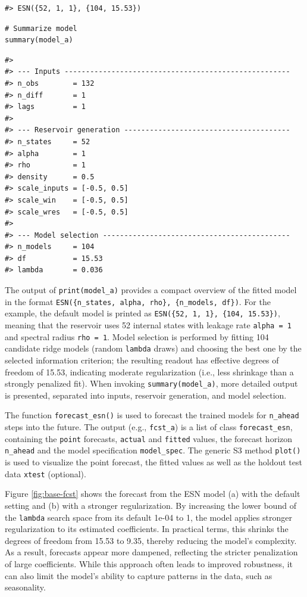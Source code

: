 \begin{verbatim}
#> ESN({52, 1, 1}, {104, 15.53})
\end{verbatim}

\begin{verbatim}
# Summarize model
summary(model_a)
\end{verbatim}

\begin{verbatim}
#> 
#> --- Inputs -----------------------------------------------------
#> n_obs        = 132
#> n_diff       = 1
#> lags         = 1
#> 
#> --- Reservoir generation ---------------------------------------
#> n_states     = 52
#> alpha        = 1
#> rho          = 1
#> density      = 0.5
#> scale_inputs = [-0.5, 0.5]
#> scale_win    = [-0.5, 0.5]
#> scale_wres   = [-0.5, 0.5]
#> 
#> --- Model selection --------------------------------------------
#> n_models     = 104
#> df           = 15.53
#> lambda       = 0.036
\end{verbatim}

The output of \texttt{print(model\_a)} provides a compact overview of the fitted model in the format \texttt{ESN(\{n\_states,\ alpha,\ rho\},\ \{n\_models,\ df\})}. For the example, the default model is printed as \texttt{ESN(\{52,\ 1,\ 1\},\ \{104,\ 15.53\})}, meaning that the reservoir uses 52 internal states with leakage rate \texttt{alpha\ =\ 1} and spectral radius \texttt{rho\ =\ 1}. Model selection is performed by fitting 104 candidate ridge models (random \texttt{lambda} draws) and choosing the best one by the selected information criterion; the resulting readout has effective degrees of freedom of 15.53, indicating moderate regularization (i.e., less shrinkage than a strongly penalized fit). When invoking \texttt{summary(model\_a)}, more detailed output is presented, separated into inputs, reservoir generation, and model selection.

The function \texttt{forecast\_esn()} is used to forecast the trained models for \texttt{n\_ahead} steps into the future. The output (e.g., \texttt{fcst\_a}) is a list of class \texttt{forecast\_esn}, containing the \texttt{point} forecasts, \texttt{actual} and \texttt{fitted} values, the forecast horizon \texttt{n\_ahead} and the model specification \texttt{model\_spec}. The generic S3 method \texttt{plot()} is used to visualize the point forecast, the fitted values as well as the holdout test data \texttt{xtest} (optional).

Figure \ref{fig:base-fcst} shows the forecast from the ESN model (a) with the default setting and (b) with a stronger regularization. By increasing the lower bound of the \texttt{lambda} search space from its default 1e-04 to 1, the model applies stronger regularization to its estimated coefficients. In practical terms, this shrinks the degrees of freedom from 15.53 to 9.35, thereby reducing the model's complexity. As a result, forecasts appear more dampened, reflecting the stricter penalization of large coefficients. While this approach often leads to improved robustness, it can also limit the model's ability to capture patterns in the data, such as seasonality.

